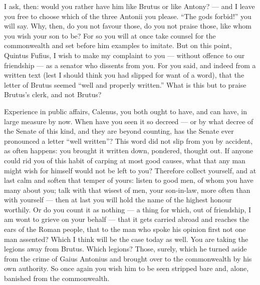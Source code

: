  I ask, then: would you rather have him like Brutus or like Antony? --- and I leave you free to choose which of the three Antonii you please. ``The gods forbid!'' you will say. Why, then, do you not favour those, do you not praise those, like whom you wish your son to be? For so you will at once take counsel for the commonwealth and set before him examples to imitate. But on this point, Quintus Fufius, I wish to make my complaint to you --- without offence to our friendship --- as a senator who dissents from you. For you said, and indeed from a written text (lest I should think you had slipped for want of a word), that the letter of Brutus seemed ``well and properly written.'' What is this but to praise Brutus's clerk, and not Brutus?

 Experience in public affairs, Calenus, you both ought to have, and can have, in large measure by now. When have you seen it so decreed --- or by what decree of the Senate of this kind, and they are beyond counting, has the Senate ever pronounced a letter ``well written''? This word did not slip from you by accident, as often happens: you brought it written down, pondered, thought out. If anyone could rid you of this habit of carping at most good causes, what that any man might wish for himself would not be left to you? Therefore collect yourself, and at last calm and soften that temper of yours: listen to good men, of whom you have many about you; talk with that wisest of men, your son-in-law, more often than with yourself --- then at last you will hold the name of the highest honour worthily. Or do you count it as nothing --- a thing for which, out of friendship, I am wont to grieve on your behalf --- that it gets carried abroad and reaches the ears of the Roman people, that to the man who spoke his opinion first not one man assented? Which I think will be the case today as well. You are taking the legions away from Brutus. Which legions? Those, surely, which he turned aside from the crime of Gaius Antonius and brought over to the commonwealth by his own authority. So once again you wish him to be seen stripped bare and, alone, banished from the commonwealth.

